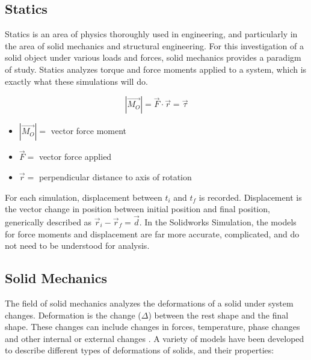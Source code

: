 \documentclass[12pt, letterpaper]{article}
\begin{document}
\subsection{Statics}
\label{sec:statics}

Statics is an area of physics thoroughly used in engineering, and particularly in the area of solid mechanics and structural engineering. For this investigation of a solid object under various loads and forces, solid mechanics provides a paradigm of study. Statics analyzes torque and force moments applied to a system, which is exactly what these simulations will do. 

\begin{singlespace}
\begin{equation}
	\label{eq:force}
	|\vec{M_O}| = \vec{F} \cdot \vec{r} = \vec{\tau}
\end{equation}
\begin{small}
	\begin{itemize}
	\item[] $|\vec{M_O}| =$ vector force moment
	\item[] $\vec{F} =$ vector force applied
	\item[] $\vec{r} =$ perpendicular distance to axis of rotation
	\end{itemize}
\end{small}
\end{singlespace}

For each simulation, displacement  between $t_i$ and $t_f$ is recorded. Displacement is the vector change in position between initial position and final position, generically described as $\vec r_i - \vec r_f = \vec d$. In the Solidworks Simulation, the models for force moments and displacement are far more accurate, complicated, and do not need to be understood for analysis. 

\subsection{Solid Mechanics}
\label{sec:solid-mechanics}

The field of solid mechanics analyzes the deformations of a solid under system changes. Deformation is the change ($\Delta$) between the rest shape and the final shape. These changes can include changes in forces, temperature, phase changes and other internal or external changes \autocite{chou_elasticity:_1992}. A variety of models have been developed to describe different types of deformations of solids, and their properties:
\end{document}
